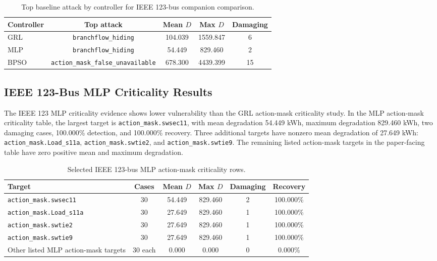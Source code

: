 \begin{table}[t]
\centering
\caption{Top baseline attack by controller for IEEE 123-bus companion comparison.}
\label{tab:ieee123_top_attack_by_controller}
\scriptsize
\begin{tabular}{lcccc}
\hline
Controller & Top attack & Mean $D$ & Max $D$ & Damaging \\
\hline
GRL & \texttt{branchflow\_hiding} & 104.039 & 1559.847 & 6 \\
MLP & \texttt{branchflow\_hiding} & 54.449 & 829.460 & 2 \\
BPSO & \texttt{action\_mask\_false\_unavailable} & 678.300 & 4439.399 & 15 \\
\hline
\end{tabular}
\end{table}

\subsection{IEEE 123-Bus MLP Criticality Results}
\label{subsec:ieee123_mlp_criticality}

The IEEE 123 MLP criticality evidence shows lower vulnerability than the GRL action-mask criticality study. In the MLP action-mask criticality table, the largest target is \texttt{action\_mask.swsec11}, with mean degradation 54.449 kWh, maximum degradation 829.460 kWh, two damaging cases, 100.000\% detection, and 100.000\% recovery. Three additional targets have nonzero mean degradation of 27.649 kWh: \texttt{action\_mask.Load\_s11a}, \texttt{action\_mask.swtie2}, and \texttt{action\_mask.swtie9}. The remaining listed action-mask targets in the paper-facing table have zero positive mean and maximum degradation.

\begin{table}[t]
\centering
\caption{Selected IEEE 123-bus MLP action-mask criticality rows.}
\label{tab:ieee123_mlp_action_mask_criticality}
\scriptsize
\begin{tabular}{lccccc}
\hline
Target & Cases & Mean $D$ & Max $D$ & Damaging & Recovery \\
\hline
\texttt{action\_mask.swsec11} & 30 & 54.449 & 829.460 & 2 & 100.000\% \\
\texttt{action\_mask.Load\_s11a} & 30 & 27.649 & 829.460 & 1 & 100.000\% \\
\texttt{action\_mask.swtie2} & 30 & 27.649 & 829.460 & 1 & 100.000\% \\
\texttt{action\_mask.swtie9} & 30 & 27.649 & 829.460 & 1 & 100.000\% \\
Other listed MLP action-mask targets & 30 each & 0.000 & 0.000 & 0 & 0.000\% \\
\hline
\end{tabular}
\end{table}

